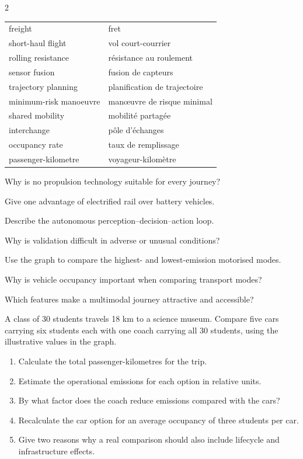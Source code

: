\begin{multicols}{2}
\begin{vocabulary}
\begin{tabularx}{\linewidth}{@{}lX@{}}
freight & fret\\
short-haul flight & vol court-courrier\\
rolling resistance & résistance au roulement\\
sensor fusion & fusion de capteurs\\
trajectory planning & planification de trajectoire\\
minimum-risk manoeuvre & manœuvre de risque minimal\\
shared mobility & mobilité partagée\\
interchange & pôle d'échanges\\
occupancy rate & taux de remplissage\\
passenger-kilometre & voyageur-kilomètre
\end{tabularx}
\end{vocabulary}

\begin{questions}
\item Why is no propulsion technology suitable for every journey?
\item Give one advantage of electrified rail over battery vehicles.
\item Describe the autonomous perception--decision--action loop.
\item Why is validation difficult in adverse or unusual conditions?
\item Use the graph to compare the highest- and lowest-emission motorised modes.
\item Why is vehicle occupancy important when comparing transport modes?
\item Which features make a multimodal journey attractive and accessible?
\end{questions}

\begin{applicationexercise}
A class of 30 students travels 18 km to a science museum. Compare five cars carrying six students
each with one coach carrying all 30 students, using the illustrative values in the graph.
\begin{enumerate}
\item Calculate the total passenger-kilometres for the trip.
\item Estimate the operational emissions for each option in relative units.
\item By what factor does the coach reduce emissions compared with the cars?
\item Recalculate the car option for an average occupancy of three students per car.
\item Give two reasons why a real comparison should also include lifecycle and infrastructure effects.
\end{enumerate}
\end{applicationexercise}


\end{multicols}
